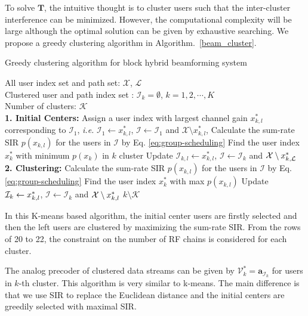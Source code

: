 \documentclass[conference]{IEEEtran}
\begin{document}
To solve $\bm{T}$, the intuitive thought is to cluster users such that the inter-cluster interference can be minimized. However, the computational complexity will be large although the optimal solution can be given by exhaustive searching. We propose a greedy clustering algorithm in Algorithm.~\ref{beam_cluster}.
\begin{algorithm}[h] 		
	\caption{Greedy clustering algorithm for block hybrid beamforming system}
	\label{beam_cluster}
	\begin{algorithmic}[1]
		\REQUIRE  \quad
		\STATE	All user index set and path set: $\mathcal{X}$, $\mathcal{L}$\\
		\STATE  Clustered user and path index set : $\mathcal{I}_k=\emptyset$, $k=1,2,\cdots, K$\\
		\STATE  Number of clusters: $\mathcal{K}$\\
		\ENSURE   	
		\STATE \textbf{1. Initial Centers:} 
		\STATE Assign a user index with largest channel gain $x^*_{k,l}$ corresponding to ${\mathcal I}_1$, {\em i.e.} $\mathcal{I}_1 \leftarrow  x^*_{k,l}$,  $\bm{\mathcal{I}} \leftarrow \mathcal{I}_1$ and ${\mathcal X}\setminus x_{k,l}^*$, 
		\STATE Calculate the sum-rate SIR $p(x_{k,l})$ for the users in $\bm{\mathcal{I}}$ by Eq. \eqref{eq:group-scheduling}
		\ENDFOR
		\STATE Find the user index $x_k^*$ with minimum $p(x_k)$ in $k$ cluster
		\STATE Update $\mathcal{I}_{k,l}\leftarrow x_{k,l}^*$, $\bm{\mathcal{I}}\leftarrow \mathcal{I}_k$ and  ${\cal X}\setminus x_{k,\mathcal{L}}^*$
		\ENDWHILE
		\STATE \textbf{2. Clustering:}
		\STATE  Calculate the sum-rate SIR $p(x_{k,l})$ for the users in $\bm{\mathcal{I}}$ by Eq. \eqref{eq:group-scheduling}
		\ENDFOR
		\STATE Find the user index $x_k^*$ with max $p(x_{k,l})$								
		\STATE	Update ${\cal I}_k \leftarrow  x_{k,l}^*$, $\bm{\mathcal{I}}\leftarrow \mathcal{I}_k$ and ${\cal X}\setminus x_{k,l}^*$	
		\STATE $k \setminus {\mathcal{K}}$
		\ENDIF
		\ENDFOR	
	\end{algorithmic}
\end{algorithm}
In this K-means based algorithm, the initial center users are firstly selected and then the left users are clustered by maximizing the sum-rate SIR. From the rows of 20 to 22, the constraint on the number of RF chains is considered for each cluster. 

The analog precoder of clustered data streams can be given by $\bm{\mathcal{V}}^*_k = \bm{\bm{a}}_{\mathcal{I}_k}$ for users in $k$-th cluster.
This algorithm is very similar to k-means. The main difference is that we use SIR to replace the Euclidean distance and the initial centers are greedily selected with maximal SIR. 
\end{document}
